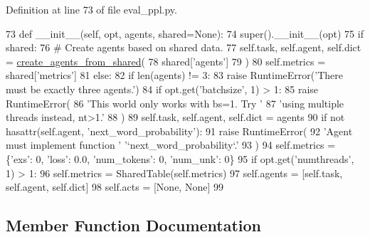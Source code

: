 Definition at line 73 of file eval\+\_\+ppl.\+py.


\begin{DoxyCode}
73     \textcolor{keyword}{def }\_\_init\_\_(self, opt, agents, shared=None):
74         super().\_\_init\_\_(opt)
75         \textcolor{keywordflow}{if} shared:
76             \textcolor{comment}{# Create agents based on shared data.}
77             self.task, self.agent, self.dict = \hyperlink{namespaceparlai_1_1core_1_1agents_a5600530545f5e60a79e2d657b5af1d8c}{create\_agents\_from\_shared}(
78                 shared[\textcolor{stringliteral}{'agents'}]
79             )
80             self.metrics = shared[\textcolor{stringliteral}{'metrics'}]
81         \textcolor{keywordflow}{else}:
82             \textcolor{keywordflow}{if} len(agents) != 3:
83                 \textcolor{keywordflow}{raise} RuntimeError(\textcolor{stringliteral}{'There must be exactly three agents.'})
84             \textcolor{keywordflow}{if} opt.get(\textcolor{stringliteral}{'batchsize'}, 1) > 1:
85                 \textcolor{keywordflow}{raise} RuntimeError(
86                     \textcolor{stringliteral}{'This world only works with bs=1. Try '}
87                     \textcolor{stringliteral}{'using multiple threads instead, nt>1.'}
88                 )
89             self.task, self.agent, self.dict = agents
90             \textcolor{keywordflow}{if} \textcolor{keywordflow}{not} hasattr(self.agent, \textcolor{stringliteral}{'next\_word\_probability'}):
91                 \textcolor{keywordflow}{raise} RuntimeError(
92                     \textcolor{stringliteral}{'Agent must implement function '} \textcolor{stringliteral}{'`next\_word\_probability`.'}
93                 )
94             self.metrics = \{\textcolor{stringliteral}{'exs'}: 0, \textcolor{stringliteral}{'loss'}: 0.0, \textcolor{stringliteral}{'num\_tokens'}: 0, \textcolor{stringliteral}{'num\_unk'}: 0\}
95             \textcolor{keywordflow}{if} opt.get(\textcolor{stringliteral}{'numthreads'}, 1) > 1:
96                 self.metrics = SharedTable(self.metrics)
97         self.agents = [self.task, self.agent, self.dict]
98         self.acts = [\textcolor{keywordtype}{None}, \textcolor{keywordtype}{None}]
99 
\end{DoxyCode}


\subsection{Member Function Documentation}
\mbox{\label{classparlai_1_1scripts_1_1eval__ppl_1_1PerplexityWorld_a6308290f51351f01a0457b586d552a1c}} 
